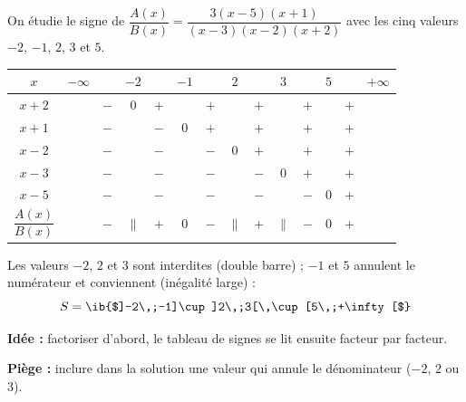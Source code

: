 \begin{enumerate}
  On étudie le signe de $\dfrac{A(x)}{B(x)}=\dfrac{3(x-5)(x+1)}{(x-3)(x-2)(x+2)}$ avec les cinq valeurs $-2$, $-1$, $2$, $3$ et $5$.
  \begin{center}
\begin{tabular}{c|ccccccccccccc}
$x$ & $-\infty$ &  & $-2$ &  & $-1$ &  & $2$ &  & $3$ &  & $5$ &  & $+\infty$ \\ \hline
$x+2$ &  & $-$ & $0$ & $+$ &  & $+$ &  & $+$ &  & $+$ &  & $+$ &  \\
$x+1$ &  & $-$ &  & $-$ & $0$ & $+$ &  & $+$ &  & $+$ &  & $+$ &  \\
$x-2$ &  & $-$ &  & $-$ &  & $-$ & $0$ & $+$ &  & $+$ &  & $+$ &  \\
$x-3$ &  & $-$ &  & $-$ &  & $-$ &  & $-$ & $0$ & $+$ &  & $+$ &  \\
$x-5$ &  & $-$ &  & $-$ &  & $-$ &  & $-$ &  & $-$ & $0$ & $+$ &  \\
$\dfrac{A(x)}{B(x)}$ &  & $-$ & $\|$ & $+$ & $0$ & $-$ & $\|$ & $+$ & $\|$ & $-$ & $0$ & $+$ &  \\
\end{tabular}
\end{center}
  Les valeurs $-2$, $2$ et $3$ sont interdites (double barre) ; $-1$ et $5$ annulent le numérateur et conviennent (inégalité large) :
  \[S=\ib{$]-2\,;-1]\cup]2\,;3[\,\cup[5\,;+\infty[$}\]
\end{enumerate}
\textbf{Idée :} factoriser d'abord, le tableau de signes se lit ensuite facteur par facteur.

\textbf{Piège :} inclure dans la solution une valeur qui annule le dénominateur ($-2$, $2$ ou $3$).
